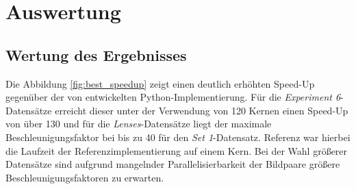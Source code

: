 \chapter{Auswertung}

\section{Wertung des Ergebnisses}

Die Abbildung \ref{fig:best_speedup} zeigt einen deutlich erhöhten Speed-Up gegenüber der von \citeauthor{Coj17} entwickelten Python-Implementierung. Für die \textit{Experiment 6}-Datensätze erreicht dieser unter der Verwendung von 120 Kernen einen Speed-Up von über 130 und für die \textit{Lenses}-Datensätze liegt der maximale Beschleunigungsfaktor bei bis zu 40 für den \textit{Set 1}-Datensatz. Referenz war hierbei die Laufzeit der Referenzimplementierung auf einem Kern. Bei der Wahl größerer Datensätze sind aufgrund mangelnder Parallelisierbarkeit der Bildpaare größere Beschleunigungsfaktoren zu erwarten.

